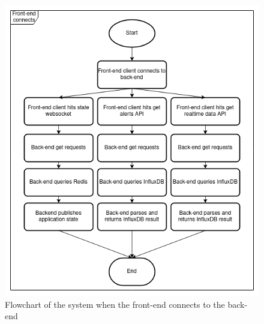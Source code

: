 \begin{figure}
      \centering
      \includegraphics[scale=0.44]{resources/flowchart-fe-connects.png}
      \caption{Flowchart of the system when the front-end connects to the back-end}
      \label{flowchart-fe-connects}
\end{figure}

